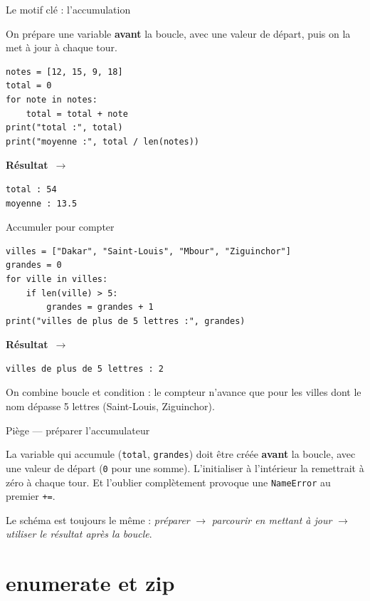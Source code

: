 \documentclass[aspectratio=169,11pt]{beamer}
\newcommand{\resultat}{{\scriptsize\textbf{R\'esultat}~$\rightarrow$}\par\vspace{1pt}}
\begin{document}
\begin{frame}[fragile]{Le motif clé : l'accumulation}
\begin{ucadex}
{\small On prépare une variable \textbf{avant} la boucle, avec une valeur de départ, puis on la met à jour à chaque tour.}
\end{ucadex}
\begin{lstlisting}
notes = [12, 15, 9, 18]
total = 0
for note in notes:
    total = total + note
print("total :", total)
print("moyenne :", total / len(notes))
\end{lstlisting}
\resultat
\begin{lstlisting}[style=out]
total : 54
moyenne : 13.5
\end{lstlisting}
\end{frame}

\begin{frame}[fragile]{Accumuler pour compter}
\begin{lstlisting}
villes = ["Dakar", "Saint-Louis", "Mbour", "Ziguinchor"]
grandes = 0
for ville in villes:
    if len(ville) > 5:
        grandes = grandes + 1
print("villes de plus de 5 lettres :", grandes)
\end{lstlisting}
\resultat
\begin{lstlisting}[style=out]
villes de plus de 5 lettres : 2
\end{lstlisting}
{\small On combine boucle et condition : le compteur n'avance que pour les villes dont le nom dépasse 5 lettres (Saint-Louis, Ziguinchor).}
\end{frame}

\begin{frame}{Piège — préparer l'accumulateur}
\begin{ucadpiege}
{\small La variable qui accumule (\texttt{total}, \texttt{grandes}) doit être créée \textbf{avant} la boucle, avec une valeur de départ (\texttt{0} pour une somme). L'initialiser à l'intérieur la remettrait à zéro à chaque tour. Et l'oublier complètement provoque une \texttt{NameError} au premier \texttt{+=}.}
\end{ucadpiege}
{\small Le schéma est toujours le même : \emph{préparer} $\rightarrow$ \emph{parcourir en mettant à jour} $\rightarrow$ \emph{utiliser le résultat après la boucle}.}
\end{frame}

\section{enumerate et zip}
\end{document}
